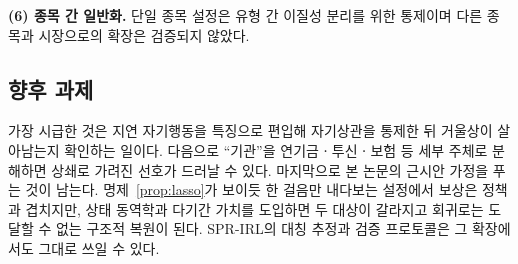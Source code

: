 \textbf{(6) 종목 간 일반화.} 단일 종목 설정은 유형 간 이질성 분리를 위한 통제이며
다른 종목과 시장으로의 확장은 검증되지 않았다.

\subsection{향후 과제}

가장 시급한 것은 지연 자기행동을 특징으로 편입해 자기상관을 통제한 뒤 거울상이
살아남는지 확인하는 일이다. 다음으로 ``기관''을 연기금ㆍ투신ㆍ보험 등 세부 주체로
분해하면 상쇄로 가려진 선호가 드러날 수 있다. 마지막으로 본 논문의 근시안 가정을
푸는 것이 남는다. 명제~\ref{prop:lasso}가 보이듯 한 걸음만 내다보는 설정에서 보상은
정책과 겹치지만, 상태 동역학과 다기간 가치를 도입하면 두 대상이 갈라지고 회귀로는
도달할 수 없는 구조적 복원이 된다. SPR-IRL의 대칭 추정과 검증 프로토콜은 그
확장에서도 그대로 쓰일 수 있다.

